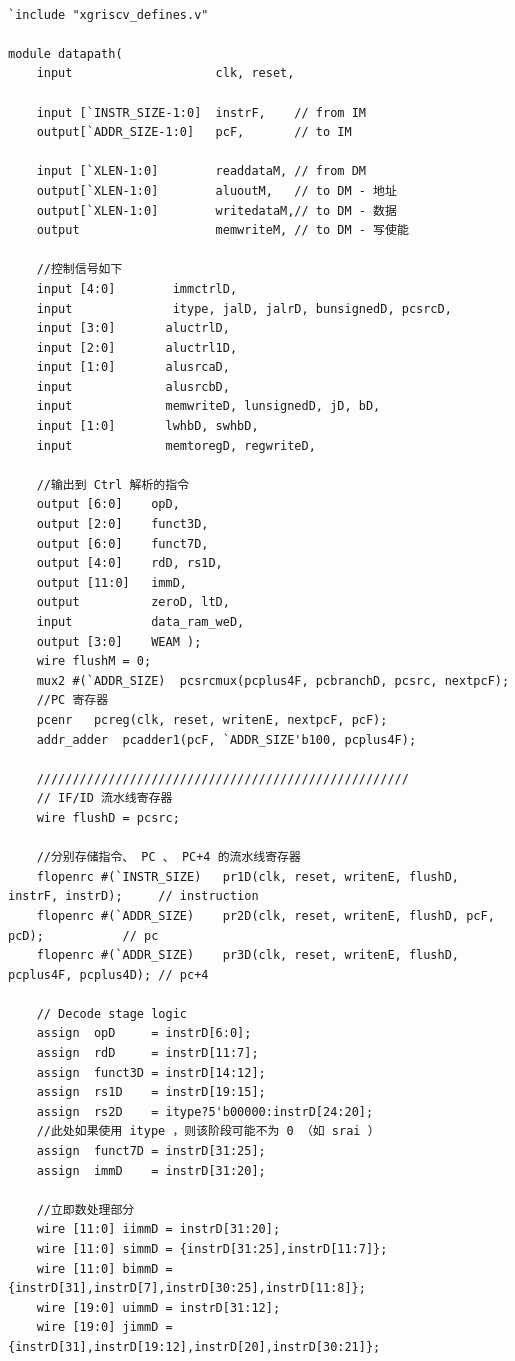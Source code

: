 \documentclass[UTF8,a4paper,autofakebold,15pt]{ctexart}
\begin{document}
{\lstset{language=verilog}
	\begin{lstlisting}
		
`include "xgriscv_defines.v"

module datapath(
	input                    clk, reset,
	
	input [`INSTR_SIZE-1:0]  instrF,	// from IM
	output[`ADDR_SIZE-1:0] 	 pcF,		// to IM
	
	input [`XLEN-1:0]	     readdataM, // from DM
	output[`XLEN-1:0]        aluoutM, 	// to DM - 地址
	output[`XLEN-1:0]	     writedataM,// to DM - 数据
	output			         memwriteM,	// to DM - 写使能
	
	//控制信号如下
	input [4:0]        immctrlD,
	input			   itype, jalD, jalrD, bunsignedD, pcsrcD,
	input [3:0]		  aluctrlD,
	input [2:0]	      aluctrl1D,
	input [1:0]       alusrcaD,
	input			  alusrcbD,
	input			  memwriteD, lunsignedD, jD, bD,
	input [1:0]		  lwhbD, swhbD,  
	input          	  memtoregD, regwriteD,
	
	//输出到 Ctrl 解析的指令
	output [6:0]	opD,
	output [2:0]	funct3D,
	output [6:0]	funct7D,
	output [4:0] 	rdD, rs1D,
	output [11:0]  	immD,
	output 	       	zeroD, ltD,
	input			data_ram_weD,
	output [3:0]	WEAM );
	wire flushM = 0;
	mux2 #(`ADDR_SIZE)	pcsrcmux(pcplus4F, pcbranchD, pcsrc, nextpcF);
	//PC 寄存器
	pcenr   pcreg(clk, reset, writenE, nextpcF, pcF);
	addr_adder  pcadder1(pcF, `ADDR_SIZE'b100, pcplus4F);
	
	////////////////////////////////////////////////////
	// IF/ID 流水线寄存器
	wire flushD = pcsrc; 

	//分别存储指令、 PC 、 PC+4 的流水线寄存器	
	flopenrc #(`INSTR_SIZE)   pr1D(clk, reset, writenE, flushD, instrF, instrD);     // instruction
	flopenrc #(`ADDR_SIZE)	  pr2D(clk, reset, writenE, flushD, pcF, pcD);           // pc
	flopenrc #(`ADDR_SIZE)	  pr3D(clk, reset, writenE, flushD, pcplus4F, pcplus4D); // pc+4
	
	// Decode stage logic
	assign  opD 	= instrD[6:0];
	assign  rdD     = instrD[11:7];
	assign  funct3D = instrD[14:12];
	assign  rs1D    = instrD[19:15];
	assign  rs2D   	= itype?5'b00000:instrD[24:20];
	//此处如果使用 itype ，则该阶段可能不为 0 （如 srai ）
	assign  funct7D = instrD[31:25];
	assign  immD    = instrD[31:20];
	
	//立即数处理部分
	wire [11:0] iimmD = instrD[31:20];
	wire [11:0]	simmD = {instrD[31:25],instrD[11:7]};
	wire [11:0] bimmD = {instrD[31],instrD[7],instrD[30:25],instrD[11:8]};
	wire [19:0]	uimmD = instrD[31:12];
	wire [19:0] jimmD = {instrD[31],instrD[19:12],instrD[20],instrD[30:21]};
	

\end{lstlisting}}
\end{document}

